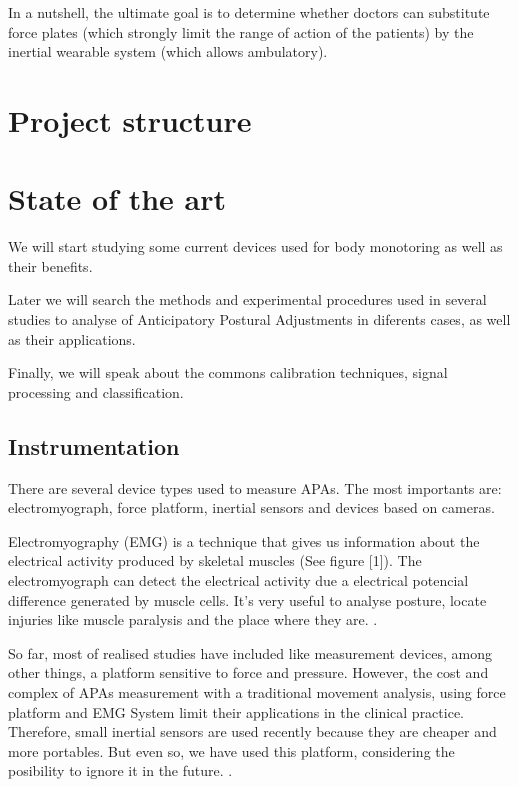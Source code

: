 In a nutshell, the ultimate goal is to determine whether doctors can substitute force plates (which strongly limit the range of action of the patients) by the inertial wearable system (which allows ambulatory).


\section{Project structure}

\section{State of the art}

We will start studying some current devices used for body monotoring as well as their benefits.

Later we will search the methods and experimental procedures used in several studies to analyse of Anticipatory Postural Adjustments in diferents cases, as well as their applications.

Finally, we will speak about the commons calibration techniques, signal processing and classification.


\subsection{Instrumentation}

There are several  device types used to measure APAs. The most importants are: electromyograph, force platform, inertial sensors and devices based on cameras. 

Electromyography (EMG) is a technique that gives us information about the electrical activity produced by skeletal muscles (See figure [1]). The electromyograph can detect  the electrical activity due a electrical potencial difference generated by muscle cells. It’s very useful to analyse posture, locate injuries like muscle paralysis and the place where they are. \cite{Marcio2010} \cite{Instr1}. 


So far, most of realised studies have included like measurement devices, among other things, a platform sensitive to force and pressure. However, the cost and complex of APAs measurement with a traditional movement analysis, using force platform and EMG System limit their applications in the  clinical practice. Therefore, small inertial sensors are used recently because they are cheaper and more portables. But even so, we have used this platform, considering the posibility to ignore it in the future. \cite{Mancini2009} \cite{Vennila2011}.

